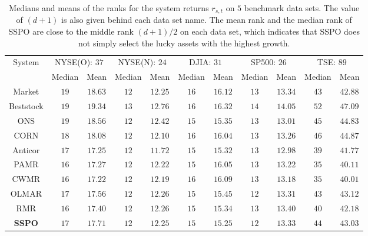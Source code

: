 \documentclass[twoside,11pt]{article}
\begin{document}
\begin{table}[!htb]
\centering
\footnotesize
\begin{tabular}{|c|c|c|c|c|c|c|c|c|c|c|}
\hline
 \multirow{2}{*}{System} &  \multicolumn{2}{|c|}{NYSE(O): $37$}  &  \multicolumn{2}{|c|}{NYSE(N): $24$}  &\multicolumn{2}{|c|}{DJIA: $31$}  & \multicolumn{2}{|c|}{SP500: $26$}  &  \multicolumn{2}{|c|}{TSE: $89$}   \\
 \cline{2-11}
 & Median & Mean   & Median & Mean   & Median & Mean   & Median & Mean  & Median & Mean\\
  \hline
  Market   & $19$  &  $18.63$  & $12$   &  $12.25$ & $16$   & $16.12$  & $13$   & $13.34$  & $43$   &  $42.88$ \\
  Beststock   & $19$  &  $19.34$  & $13$   &  $12.76$ & $16$   &  $16.32$ & $14$   &  $14.05$ & $52$   &  $47.09$ \\
    ONS   & $19$  &  $18.56$  & $12$   &  $12.42$ & $15$   &  $15.35$ & $13$   &  $13.01$ & $45$   &  $44.83$ \\
  CORN     & $18$   &  $18.08$   & $12$   &  $12.10$ & $16$   &  $16.04$ & $13$   &  $13.26$ & $46$   &  $44.87$ \\
  Anticor     & $17$   &  $17.25$   & $12$   &  $11.72$ & $15$  &  $15.32$  & $13$   &  $12.98$ & $39$   &  $41.77$ \\
  PAMR     & $16$   &  $17.27$   & $12$   &  $12.22$ & $15$  &  $16.05$  & $13$   &  $13.22$ & $35$   &  $40.11$ \\
  CWMR     & $16$   &  $17.22$   & $12$   &  $12.19$ & $16$  &  $16.09$  & $13$   &  $13.18$ & $35$   &  $40.01$ \\
  OLMAR     & $17$   &  $17.56$   & $12$   &  $12.26$ & $15$   &  $15.45$ & $12$   &  $13.31$ & $43$   &  $43.12$ \\
  RMR    & $16$   &  $17.40$   & $12$   &  $12.26$ & $15$   &  $15.34$ & $13$   &  $13.40$ & $40$   &  $42.18$ \\
\hline
  \textbf{SSPO}  & $17$   &  $17.71$  & $12$   &  $12.25$  &  $15$   &  $15.25$ &  $12$   &  $13.33$ & $44$   &  $43.03$  \\
  \hline
\end{tabular}
\normalsize
\caption{Medians and means of the ranks for the system returns $r_{s,t}$ on $5$ benchmark data sets. The value of $(d+1)$ is also given behind each data set name. The mean rank and the median rank of SSPO are close to the middle rank $(d+1)/2$ on each data set, which indicates that SSPO does not simply select the lucky assets with the highest growth.}
\label{tab:rank}
\end{table}
\newpage
\end{document}
